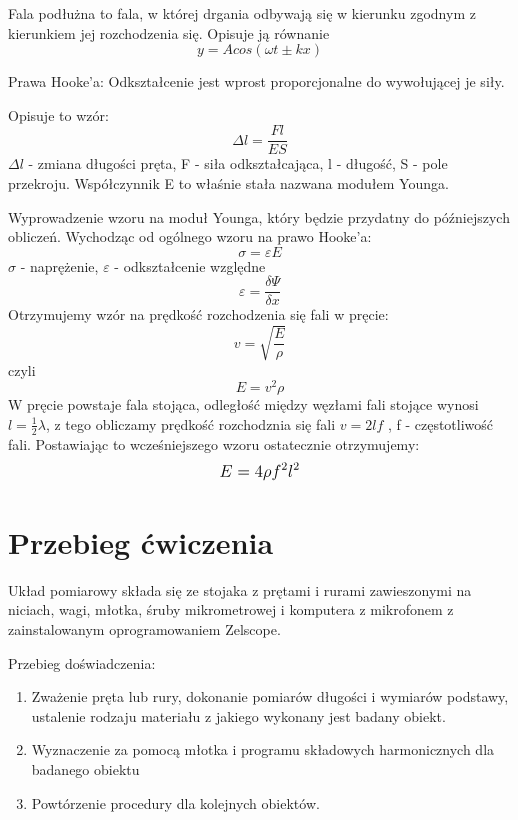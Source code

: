 \documentclass{article}
\begin{document}
 Fala podłużna  to fala, w której drgania odbywają się w kierunku zgodnym z kierunkiem jej rozchodzenia się. 
 Opisuje ją równanie $$ y= Acos(\omega t \pm kx) $$
 
 Prawa Hooke'a: Odkształcenie jest wprost proporcjonalne do wywołującej je siły.
 \newline
 
 Opisuje to wzór: $$ \Delta l = \frac{Fl}{ES} $$
 $\Delta l$ - zmiana długości pręta, F - siła odkształcająca, l - długość, S - pole przekroju. \newline
 Współczynnik E to właśnie stała nazwana modułem Younga.
 
 Wyprowadzenie wzoru na moduł Younga, który będzie przydatny do późniejszych obliczeń.
 \newline
 Wychodząc od ogólnego wzoru na prawo Hooke'a: 
 $$ \sigma = \varepsilon E $$  $\sigma $ - naprężenie, $\varepsilon $ - odkształcenie względne
 $$ \varepsilon = \frac{\delta \Psi}{\delta x} $$
 \newline
Otrzymujemy wzór na  prędkość rozchodzenia się fali w pręcie: 
$$ v = \sqrt{\frac{E}{\rho}} $$
czyli $$ E = v^2\rho $$
\newline
W pręcie powstaje fala stojąca, odległość między węzłami fali stojące wynosi $ l = \frac{1}{2} \lambda $, z tego obliczamy prędkość rozchodznia się fali $ v = 2lf $ , f - częstotliwość fali.
\newline
Postawiając to wcześniejszego wzoru ostatecznie otrzymujemy:
$$\mathlarger{E = 4\rho f^2 l^2}$$

 
 
 
 
 
 
 
 
 
 
 
 
 
 
 
 
\section{Przebieg ćwiczenia}

Układ pomiarowy składa się ze stojaka z prętami i rurami zawieszonymi na niciach, wagi, młotka, śruby mikrometrowej i komputera z mikrofonem z zainstalowanym oprogramowaniem Zelscope.

Przebieg doświadczenia:
\begin{enumerate}

    \item Zważenie pręta lub rury, dokonanie pomiarów długości i wymiarów podstawy, ustalenie rodzaju materiału z jakiego wykonany jest badany obiekt.
    \item Wyznaczenie za pomocą młotka i programu składowych harmonicznych dla badanego obiektu
    \item Powtórzenie procedury dla kolejnych obiektów.
     
            
\end{enumerate}
\end{document}
